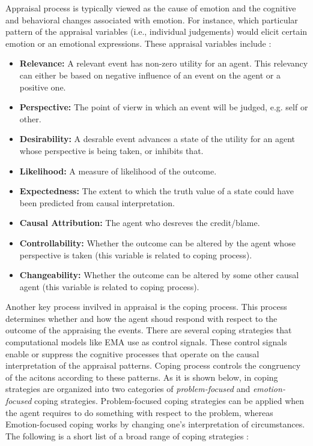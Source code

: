 \documentclass[11pt]{article}
\begin{document}
Appraisal process is typically viewed as the cause of emotion and the cognitive
and behavioral changes associated with emotion. For instance, which particular
pattern of the appraisal variables (i.e., individual judgements) would elicit
certain emotion or an emotional expressions. These appraisal variables
include \cite{marsella:ema-process-model}:\\

\begin{itemize}
  \item \textbf{Relevance:} A relevant event has non-zero utility for an agent.
  This relevancy can either be based on negative influence of an event on the
  agent or a positive one.
  
  \item \textbf{Perspective:} The point of vierw in which an event will be
  judged, e.g. self or other.
  
  \item \textbf{Desirability:} A desrable event advances a state of the utility
  for an agent whose perspective is being taken, or inhibits that.
  
  \item \textbf{Likelihood:} A measure of likelihood of the outcome.
  
  \item \textbf{Expectedness:} The extent to which the truth value of a state
  could have been predicted from causal interpretation.
  
  \item \textbf{Causal Attribution:} The agent who desreves the credit/blame.
  
  \item \textbf{Controllability:} Whether the outcome can be altered by the
  agent whose perspective is taken (this variable is related to coping process).
  
  \item \textbf{Changeability:} Whether the outcome can be altered by some other
  causal agent (this variable is related to coping process).
\end{itemize}

Another key process invilved in appraisal is the coping process. This process
determines whether and how the agent shoud respond with respect to the outcome
of the appraising the events. There are several coping strategies that
computational models like EMA \cite{gratch:domain-independent} use as control
signals. These control signals enable or suppress the cognitive processes that
operate on the causal interpretation of the appraisal patterns. Coping process
controls the congruency of the acitons according to these patterns. As it is
shown below, in \cite{gratch:domain-independent} coping strategies are organized
into two categories of \textit{problem-focused} and \textit{emotion-focused}
coping strategies. Problem-focused coping strategies can be applied when the
agent requires to do something with respect to the problem, whereas
Emotion-focused coping works by changing one's interpretation of circumstances.
The following is a short list of a broad range of coping strategies
\cite{gratch:domain-independent}:
\end{document}
